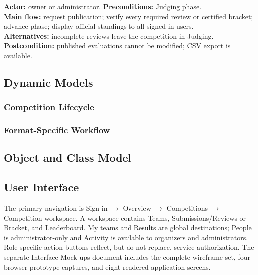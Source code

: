 \begin{contentbox}
\textbf{Actor:} owner or administrator. \textbf{Preconditions:} Judging phase.\\
\textbf{Main flow:} request publication; verify every required review or certified bracket; advance phase; display official standings to all signed-in users.\\
\textbf{Alternatives:} incomplete reviews leave the competition in Judging.\\
\textbf{Postcondition:} published evaluations cannot be modified; CSV export is available.
\end{contentbox}
\begin{umlpage}
\subsection{Dynamic Models}
\clearpage\subsubsection*{Competition Lifecycle}
\clearpage\subsubsection*{Format-Specific Workflow}
\end{umlpage}
\begin{umlpage}
\subsection{Object and Class Model}
\end{umlpage}
\clearpage\subsection{User Interface}
The primary navigation is Sign in $\rightarrow$ Overview $\rightarrow$ Competitions $\rightarrow$ Competition workspace. A workspace contains Teams, Submissions/Reviews or Bracket, and Leaderboard. My teams and Results are global destinations; People is administrator-only and Activity is available to organizers and administrators. Role-specific action buttons reflect, but do not replace, service authorization.
The separate Interface Mock-ups document includes the complete wireframe set, four browser-prototype captures, and eight rendered application screens.

